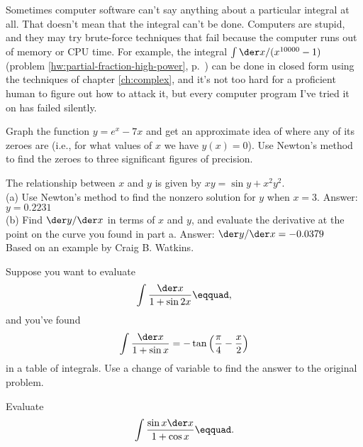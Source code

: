 Sometimes computer software can't say anything about a particular integral at all. That doesn't mean that the integral
can't be done. Computers are stupid, and they may try brute-force techniques that fail because the
computer runs out of memory or CPU time. For example, the integral $\int \der x/(x^{10000}-1)$ 
(problem \ref{hw:partial-fraction-high-power}, p.~\pageref{hw:partial-fraction-high-power}) can be
done in closed form using the techniques of chapter \ref{ch:complex}, and it's not too hard for
a proficient human to figure out how to attack it, but every computer program I've tried it on has
failed silently.

\begin{hwsection}
\begin{hw}
Graph the function $y=e^x-7x$ and get an approximate idea of where any of its zeroes
are (i.e., for what values of $x$ we have $y(x)=0$).
Use Newton's method to find the zeroes to three significant figures of precision.
\end{hw}

\begin{hw}
The relationship between $x$ and $y$ is given by $xy = \sin y+x^2y^2$.\\
(a) Use Newton's method to find the nonzero solution for $y$ when $x=3$. Answer: $y=0.2231$\\
(b) Find $\der y/\der x$ in terms of $x$ and $y$, and evaluate the derivative
at the point on the curve you found in part a. Answer: $\der y/\der x=-0.0379$\\
{\footnotesize Based on an example by Craig B. Watkins.}
\end{hw}

\begin{hw}
Suppose you want to evaluate
\begin{equation*}
  \int \frac{\der x}{1+\sin 2x}\eqquad,
\end{equation*}
and you've found
\begin{equation*}
  \int \frac{\der x}{1+\sin x} = -\tan\left(\frac{\pi}{4}-\frac{x}{2}\right)
\end{equation*}
in a table of integrals. Use a change of variable to find the answer to the
original problem.
\end{hw}

\begin{hw}
Evaluate
\begin{equation*}
  \int \frac{\sin x \der x}{1+\cos x}\eqquad.
\end{equation*}
\end{hw}


\end{hwsection}
